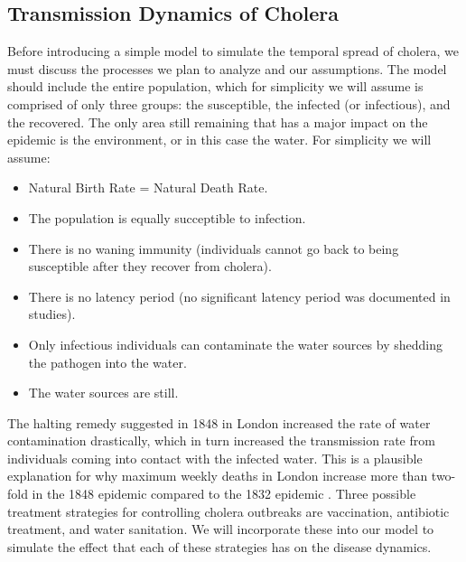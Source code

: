\documentclass[12pt]{article}\usepackage[]{graphicx}\usepackage[]{color}
\begin{document}
\subsection{Transmission Dynamics of Cholera}
Before introducing a simple model to simulate the temporal spread of cholera, we must discuss the processes we plan to analyze and our assumptions.
The model should include the entire population, which for simplicity we will assume is comprised of only three groups: the susceptible, the infected (or infectious), and the recovered.
The only area still remaining that has a major impact on the epidemic is the environment, or in this case the water.
For simplicity we will assume:
\begin{itemize}
\item Natural Birth Rate = Natural Death Rate.
\item The population is equally succeptible to infection.
\item There is no waning immunity (individuals cannot go back to being susceptible after they recover from cholera).
\item There is no latency period (no significant latency period was documented in studies).
\item Only infectious individuals can contaminate the water sources by shedding the pathogen into the water.
\item The water sources are still.
\end{itemize}
The halting remedy suggested in 1848 in London increased the rate of water contamination drastically, which in turn increased the transmission rate from individuals coming into contact with the infected water.
This is a plausible explanation for why maximum weekly deaths in London increase more than two-fold in the 1848 epidemic compared to the 1832 epidemic \citep{link3}.
Three possible treatment strategies for controlling cholera outbreaks are vaccination, antibiotic treatment, and water sanitation.
We will incorporate these into our model to simulate the effect that each of these strategies has on the disease dynamics.
\end{document}
